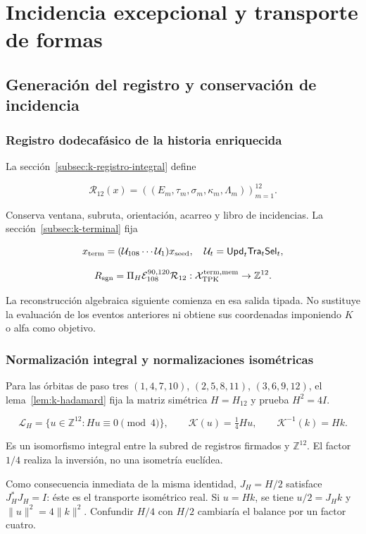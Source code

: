 \section{Incidencia excepcional y transporte de formas}
\label{nuclear:4}
\subsection{Generación del registro y conservación de incidencia}

\subsubsection{Registro dodecafásico de la historia enriquecida}

La sección~\ref{subsec:k-registro-integral} define

\[
\mathcal R_{12}(x)=((E_m,\tau_m,\sigma_m,\kappa_m,\Lambda_m))_{m=1}^{12}.
\]

Conserva ventana, subruta, orientación, acarreo y libro de incidencias. La sección~\ref{subsec:k-terminal} fija

\[
x_{\rm term}=(\mathcal U_{108}\cdots\mathcal U_1)x_{\rm seed},
\quad \mathcal U_t=\mathsf{Upd}_t\mathsf{Tra}_t\mathsf{Sel}_t,
\]

\[
R_{\rm sgn}=\Pi_H\mathcal E_{108}^{90,120}\mathcal R_{12}:
\mathcal X_{\rm TPK}^{\rm term,mem}\to\mathbb Z^{12}.
\]

La reconstrucción algebraica siguiente comienza en esa salida tipada. No sustituye la evaluación de los eventos anteriores ni obtiene sus coordenadas imponiendo \(K\) o alfa como objetivo.

\subsubsection{Normalización integral y normalizaciones isométricas}

Para las órbitas de paso tres \((1,4,7,10)\), \((2,5,8,11)\), \((3,6,9,12)\), el lema~\ref{lem:k-hadamard} fija la matriz simétrica \(H=H_{12}\) y prueba \(H^2=4I\).

\[
\mathcal L_H=\{u\in\mathbb Z^{12}:Hu\equiv0\pmod4\},
\qquad \mathscr K(u)=\tfrac14Hu,
\qquad \mathscr K^{-1}(k)=Hk.
\]

Es un isomorfismo integral entre la subred de registros firmados y \(\mathbb Z^{12}\). El factor \(1/4\) realiza la inversión, no una isometría euclídea.

Como consecuencia inmediata de la misma identidad, \(J_H=H/2\) satisface \(J_H^*J_H=I\): éste es el transporte isométrico real. Si \(u=Hk\), se tiene \(u/2=J_Hk\) y \(\|u\|^2=4\|k\|^2\). Confundir \(H/4\) con \(H/2\) cambiaría el balance por un factor cuatro.

